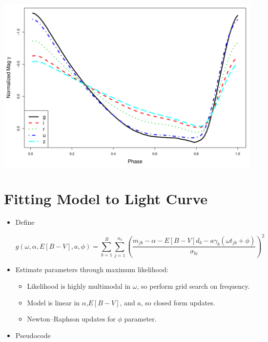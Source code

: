\documentclass[a0,portrait]{a0poster}
\begin{document}
\begin{multicols}{2}
\begin{itemize}
\begin{center}\vspace{1cm}
\includegraphics[width=0.55\linewidth]{templates.pdf}
\end{center}\vspace{1cm}


\end{itemize}


\section*{Fitting Model to Light Curve}

\begin{itemize}

\item Define

\begin{equation*}
g(\omega,\alpha,E[B-V],a,\phi) = \sum_{b=1}^B \sum_{j=1}^{n_b}\left(\frac{m_{jb} - \alpha - E[B-V]d_b - a\gamma_b(\omega t_{jb} + \phi)}{\sigma_{bi}}\right)^2
\end{equation*}

\item Estimate parameters through maximum likelihood:
\begin{itemize}
\item Likelihood is highly multimodal in $\omega$, so perform grid search on frequency.
\item Model is linear in $\alpha$,$E[B-V]$, and $a$, so closed form updates.
\item Newton--Raphson updates for $\phi$ parameter.
\end{itemize}

\item Pseudocode


\end{itemize}
\end{multicols}
\end{document}
